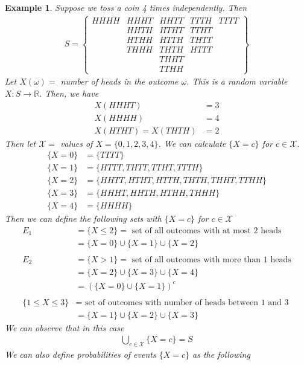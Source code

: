 \documentclass[11pt,oneside]{book}
\theoremstyle{newStyle}
\newtheorem{ex}{Example}[section]
\newcommand{\R}{\mathbb{R}}
\newcommand{\X}{\mathcal{X}}
\begin{document}
\begin{ex}
Suppose we toss a coin 4 times independently. Then \begin{align*}
S=\begin{Bmatrix}
HHHH & HHHT &HHTT &TTTH &TTTT\\
 &HHTH &HTHT &TTHT &\\
 &HTHH&HTTH &THTT&\\
 &THHH&THTH&HTTT&\\
 &&THHT&&\\
 &&TTHH&&
\end{Bmatrix}
\end{align*}
Let $X(\omega)=$ number of heads in the outcome $\omega$. This is a random variable $X:S\rightarrow \R$. Then, we have \begin{align*}
X(HHHT)&=3\\
X(HHHH)&=4\\
X(HTHT)=X(THTH)&=2
\end{align*}
Then let $\X=$ values of $X=\{0,1,2,3,4\}$. We can calculate $\{X=c\}$ for $c\in \X$.\begin{align*}
\{X=0\}&=\{TTTT\}\\
\{X=1\}&=\{HTTT,THTT,TTHT,TTTH\}\\
\{X=2\}&=\{HHTT,HTHT,HTTH,THTH,THHT,TTHH\}\\
\{X=3\}&=\{HHHT,HHTH,HTHH,THHH\}\\
\{X=4\}&=\{HHHH\}
\end{align*}
Then we can define the following sets with $\{X=c\}$ for $c\in \X$ \begin{align*}
 E_1&=\{X\leq 2\}=\text{ set of all outcomes with at most 2 heads}\\
 &=\{X=0\}\cup \{X=1\}\cup \{X=2\}\\
 \\
 E_2&=\{X>1\}=\text{ set of all outcomes with more than 1 heads}\\
 &=\{X=2\}\cup \{X=3\}\cup \{X=4\}\\
 &=\left(\{X=0\}\cup \{X=1\}\right)^c\\
 \\
 \{1\leq X\leq 3\}&=\text{ set of outcomes with number of heads between 1 and 3}\\
 &=\{X=1\}\cup \{X=2\}\cup \{X=3\}
\end{align*}
We can observe that in this case\begin{align*}
\bigcup_{c\in \X}\{X=c\}=S
\end{align*}
We can also define probabilities of events $\{X=c\}$ as the following \begin{align*}

\end{align*}
\end{ex}
\end{document}
